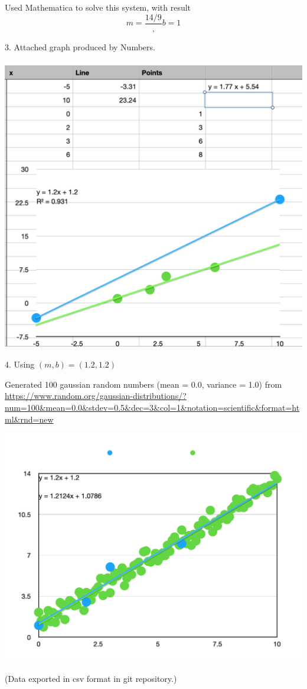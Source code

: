 \documentclass[12pt,letterpaper]{hmcpset}
\begin{document}
\begin{solution}
Used Mathematica to solve this system, with result
\[
  m = \frac{14/9}, b = 1
\]

 3. Attached graph produced by Numbers.

\includegraphics[scale=0.4]{hw1-p2-graph1.png}

\newpage

4. Using $(m,b) = (1.2, 1.2)$

Generated 100 gaussian random numbers (mean = 0.0, variance = 1.0) from \url{https://www.random.org/gaussian-distributions/?num=100&mean=0.0&stdev=0.5&dec=3&col=1&notation=scientific&format=html&rnd=new}

\includegraphics[scale=0.4]{hw1-p2-graph2.png}

(Data exported in csv format in git repository.)


    \vfill
\end{solution}
\newpage
\end{document}
